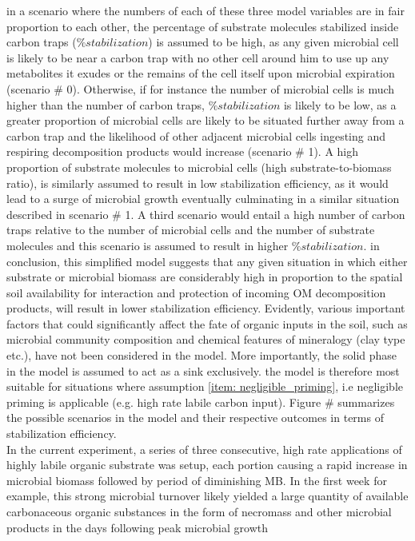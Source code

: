 \documentclass[12pt]{report}
\begin{document}
in a scenario where the numbers of each of these three model variables are in fair proportion to each other, the percentage of substrate molecules stabilized inside carbon traps ($ \%stabilization $) is assumed to be high, as any given microbial cell is likely to be near a carbon trap with no other cell around him to use up any metabolites it exudes or the remains of the cell itself upon microbial expiration (scenario \# 0). Otherwise, if for instance the number of microbial cells is much higher than the number of carbon traps, $ \%stabilization  $ is likely to be low, as a greater proportion of microbial cells are likely to be situated further away from a carbon trap and the likelihood of other adjacent microbial cells ingesting and respiring decomposition products would increase (scenario \# 1). A high proportion of substrate molecules to microbial cells (high substrate-to-biomass ratio),  is similarly assumed to result in low stabilization efficiency, as it would lead to a surge  of microbial growth eventually culminating in a similar situation described in scenario \# 1. A third scenario would entail a high number of carbon traps relative to the number of microbial cells and the number of substrate molecules and this scenario is assumed to result in higher $ \%stabilization $.  in conclusion, this simplified model suggests that any given situation in which either substrate or microbial biomass are considerably high in proportion to the spatial soil availability for interaction and protection of incoming OM decomposition products, will result in lower stabilization efficiency. Evidently, various important factors that could significantly affect the fate of organic inputs in the soil, such as microbial community composition and  chemical features of mineralogy (clay type etc.), have not been considered in the model. More importantly, the solid phase in the model is assumed to act as a sink exclusively. the model is therefore most suitable for situations where assumption \ref{item: negligible_priming}, i.e negligible priming is applicable (e.g. high rate labile carbon input). Figure \# summarizes the possible scenarios in the model and their respective outcomes in terms of stabilization efficiency.\\
In the current experiment, a series of three consecutive, high rate applications of highly labile organic substrate was setup, each portion causing a rapid increase in microbial biomass followed by period of diminishing MB. In the first week for example, this strong microbial turnover likely yielded a large quantity of available carbonaceous organic substances in the form of necromass and other microbial products in the days following peak microbial growth 
\end{document}
